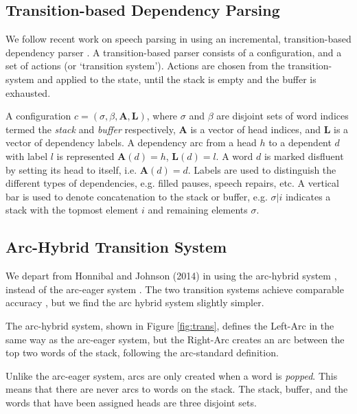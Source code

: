 \documentclass[11pt,letterpaper]{article}
\begin{document}
\subsection{Transition-based Dependency Parsing}

We follow recent work on speech parsing in using an incremental, transition-based
dependency parser \citep{rasooli:13,honnibal:14}.
A transition-based parser \citep{nivre:03} consists of a configuration,
and a set of actions (or `transition system').  Actions are chosen from the
transition-system and applied to the state, until the stack is empty and the
buffer is exhausted.

A configuration $c = (\sigma, \beta, \mathbf{A}, \mathbf{L})$,
where $\sigma$ and $\beta$ are disjoint sets of word
indices termed the \emph{stack} and \emph{buffer} respectively, $\mathbf{A}$ is a
vector of head indices, and $\mathbf{L}$ is a vector of dependency labels.  A
dependency arc from a head $h$ to a dependent $d$ with label $l$ is represented
$\mathbf{A}(d)=h$, $\mathbf{L}(d)=l$.  A word $d$ is marked disfluent by setting
its head to itself, i.e. $\mathbf{A}(d)=d$.  Labels are used to distinguish the
different types of dependencies,
e.g. filled pauses, speech repairs, etc.
A vertical bar is used to denote concatenation
to the stack or buffer, e.g. $\sigma | i$ indicates a stack with the topmost
element $i$ and remaining elements $\sigma$.

\subsection{Arc-Hybrid Transition System}

We depart from Honnibal and Johnson (2014) in using the arc-hybrid system \citep{kuhlmann:11},
instead of the arc-eager system \citep{nivre:03}. The two transition systems achieve
comparable accuracy \citep{goldberg:13}, but we find the arc hybrid system slightly
simpler.

The arc-hybrid system, shown in Figure \ref{fig:trans}, defines the Left-Arc in
the same way as the \citet{nivre:03}
arc-eager system, but the Right-Arc creates an arc between the top two words of
the stack, following the arc-standard definition.

Unlike the arc-eager system,
arcs are only created when a word is \emph{popped}.
This means that there are never arcs to words on the stack.
The stack, buffer, and the words that have been assigned heads are three disjoint
sets.
\end{document}
